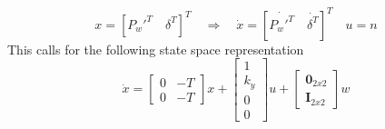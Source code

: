 	\begin{equation}
		x = [ P_w'^T \quad \delta^T]^T \quad \Rightarrow  \quad \dot{x} = [\dot{P_w'^T} \quad
		\dot{\delta^T}]^T \quad  u = n
	\end{equation}
	This calls for the following state space representation 
	\begin{equation}
		\dot{x} = \left [ \begin{array}{cc}
					0 & -T \\
					0 & -T
				\end{array} \right] x + \left [ \begin{array}{c}
								1 \\
								k_y\\
								0 \\
								0
								\end{array} \right] u +
				\left [ \begin{array}{c}
						\mathbf{0}_{2x2} \\
						\mathbf{I}_{2x2} 
					\end{array} \right] w
	\end{equation}

